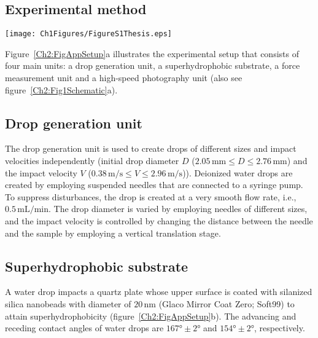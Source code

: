 \begin{subappendices}
	
	\section{Experimental method}\label{sec:ExpMethods}

	\begin{sidewaysfigure}
		\centering
		\texttt{[image: Ch1Figures/FigureS1Thesis.eps]}
		\caption{(a) Experimental setup, consisting of four main units: a drop generation unit, a superhydrophobic substrate, a force measurement unit, and a high-speed photography unit. Relevant appurtenant devices are shown. Also see figure~\ref{Ch2:Fig1Schematic}(a). (b) Snapshot of a water drop sitting on a superhydrophobic substrate with overlaid orange boundary from simulation. The inset shows the scanning electron microscopy (SEM) image of the superhydrophobic surface covered by hydrophobic nanoparticles.}
		\label{Ch2:FigAppSetup}
	\end{sidewaysfigure}

	Figure~\ref{Ch2:FigAppSetup}a illustrates the experimental setup that consists of four main units: a drop generation unit, a superhydrophobic substrate, a force measurement unit and a high-speed photography unit (also see figure~\ref{Ch2:Fig1Schematic}a). 
	
	\subsection{Drop generation unit}
	
	The drop generation unit is used to create drops of different sizes and impact velocities independently (initial drop diameter $D$ ($2.05\,\si{\milli\meter} \le D \le 2.76\,\si{\milli\meter}$) and the impact velocity $V$ ($0.38\,\si{\meter}/\si{\second} \le V \le 2.96\,\si{\meter}/\si{\second}$)). Deionized water drops are created by employing suspended needles that are connected to a syringe pump. To suppress disturbances, the drop is created at a very smooth flow rate, i.e., $0.5\,\si{\milli\liter}/\si{\minute}$. The drop diameter is varied by employing needles of different sizes, and the impact velocity is controlled by changing the distance between the needle and the sample by employing a vertical translation stage.
	
	\subsection{Superhydrophobic substrate}\label{Ch2:sec::substrate}
	A water drop impacts a quartz plate whose upper surface is coated with silanized silica nanobeads with diameter of $20\,\si{\nano\meter}$ (Glaco Mirror Coat Zero; Soft99) \cite{li2017, gauthier2015}  to attain superhydrophobicity (figure~\ref{Ch2:FigAppSetup}b). The advancing and receding contact angles of water drops are $167\si{\degree} \pm 2\si{\degree}$ and $154\si{\degree} \pm 2\si{\degree}$, respectively. 
	

\end{subappendices}
